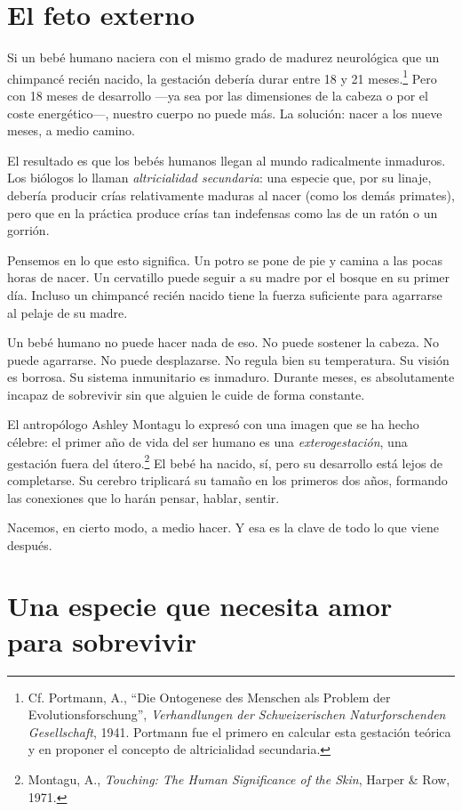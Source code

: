 \section{El feto externo}

Si un bebé humano naciera con el mismo grado de madurez neurológica que un chimpancé recién nacido, la gestación debería durar entre 18 y 21 meses.\footnote{Cf. Portmann, A., ``Die Ontogenese des Menschen als Problem der Evolutionsforschung'', \textit{Verhandlungen der Schweizerischen Naturforschenden Gesellschaft}, 1941. Portmann fue el primero en calcular esta gestación teórica y en proponer el concepto de altricialidad secundaria.} Pero con 18 meses de desarrollo ---ya sea por las dimensiones de la cabeza o por el coste energético---, nuestro cuerpo no puede más. La solución: nacer a los nueve meses, a medio camino.

El resultado es que los bebés humanos llegan al mundo radicalmente inmaduros. Los biólogos lo llaman \textit{altricialidad secundaria}: una especie que, por su linaje, debería producir crías relativamente maduras al nacer (como los demás primates), pero que en la práctica produce crías tan indefensas como las de un ratón o un gorrión.

Pensemos en lo que esto significa. Un potro se pone de pie y camina a las pocas horas de nacer. Un cervatillo puede seguir a su madre por el bosque en su primer día. Incluso un chimpancé recién nacido tiene la fuerza suficiente para agarrarse al pelaje de su madre.

Un bebé humano no puede hacer nada de eso. No puede sostener la cabeza. No puede agarrarse. No puede desplazarse. No regula bien su temperatura. Su visión es borrosa. Su sistema inmunitario es inmaduro. Durante meses, es absolutamente incapaz de sobrevivir sin que alguien le cuide de forma constante.

El antropólogo Ashley Montagu lo expresó con una imagen que se ha hecho célebre: el primer año de vida del ser humano es una \textit{exterogestación}, una gestación fuera del útero.\footnote{Montagu, A., \textit{Touching: The Human Significance of the Skin}, Harper \& Row, 1971.} El bebé ha nacido, sí, pero su desarrollo está lejos de completarse. Su cerebro triplicará su tamaño en los primeros dos años, formando las conexiones que lo harán pensar, hablar, sentir.

Nacemos, en cierto modo, a medio hacer. Y esa es la clave de todo lo que viene después.

\section{Una especie que necesita amor para sobrevivir}

